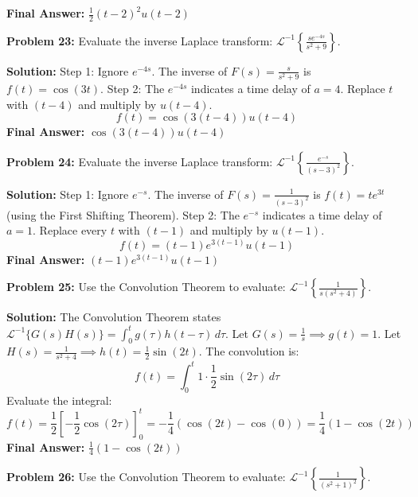 \documentclass[11pt, letterpaper]{article}
\theoremstyle{definition}
\theoremstyle{remark}
\begin{document}
\textbf{Final Answer:} $\displaystyle \frac{1}{2}(t-2)^2 u(t-2)$

\vspace{1em}

\textbf{Problem 23:} Evaluate the inverse Laplace transform: $\displaystyle \mathcal{L}^{-1} \left\{ \frac{s e^{-4s}}{s^2 + 9} \right\}$.

\textbf{Solution:}
Step 1: Ignore $e^{-4s}$. The inverse of $F(s) = \frac{s}{s^2+9}$ is $f(t) = \cos(3t)$.
Step 2: The $e^{-4s}$ indicates a time delay of $a = 4$. Replace $t$ with $(t-4)$ and multiply by $u(t-4)$.
\[
f(t) = \cos(3(t-4)) u(t-4)
\]
\textbf{Final Answer:} $\displaystyle \cos(3(t-4)) u(t-4)$

\vspace{1em}

\textbf{Problem 24:} Evaluate the inverse Laplace transform: $\displaystyle \mathcal{L}^{-1} \left\{ \frac{e^{-s}}{(s-3)^2} \right\}$.

\textbf{Solution:}
Step 1: Ignore $e^{-s}$. The inverse of $F(s) = \frac{1}{(s-3)^2}$ is $f(t) = te^{3t}$ (using the First Shifting Theorem).
Step 2: The $e^{-s}$ indicates a time delay of $a = 1$. Replace every $t$ with $(t-1)$ and multiply by $u(t-1)$.
\[
f(t) = (t-1)e^{3(t-1)} u(t-1)
\]
\textbf{Final Answer:} $\displaystyle (t-1)e^{3(t-1)} u(t-1)$

\vspace{1em}

\textbf{Problem 25:} Use the Convolution Theorem to evaluate: $\displaystyle \mathcal{L}^{-1} \left\{ \frac{1}{s(s^2+4)} \right\}$.

\textbf{Solution:}
The Convolution Theorem states $\mathcal{L}^{-1}\{G(s)H(s)\} = \int_0^t g(\tau)h(t-\tau) \, d\tau$.
Let $G(s) = \frac{1}{s} \implies g(t) = 1$.
Let $H(s) = \frac{1}{s^2+4} \implies h(t) = \frac{1}{2}\sin(2t)$.
The convolution is:
\[
f(t) = \int_0^t 1 \cdot \frac{1}{2}\sin(2\tau) \, d\tau
\]
Evaluate the integral:
\[
f(t) = \frac{1}{2} \left[ -\frac{1}{2}\cos(2\tau) \right]_0^t = -\frac{1}{4}(\cos(2t) - \cos(0)) = \frac{1}{4}(1 - \cos(2t))
\]
\textbf{Final Answer:} $\displaystyle \frac{1}{4}(1 - \cos(2t))$

\vspace{1em}

\textbf{Problem 26:} Use the Convolution Theorem to evaluate: $\displaystyle \mathcal{L}^{-1} \left\{ \frac{1}{(s^2+1)^2} \right\}$.
\end{document}
